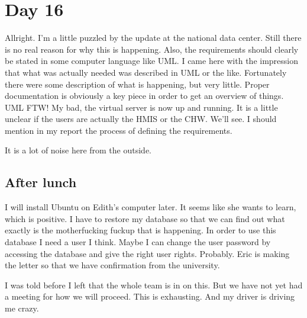 \section{Day 16}
Allright. I'm a little puzzled by the update at the national data center.
Still there is no real reason for why this is happening.
Also, the requirements should clearly be stated in some computer language like UML.
I came here with the impression that what was actually needed was described in UML or the like.
Fortunately there were some description of what is happening, but very little.
Proper documentation is obviously a key piece in order to get an overview of things.
UML FTW!
My bad, the virtual server is now up and running.
It is a little unclear if the users are actually the HMIS or the CHW. 
We'll see.
I should mention in my report the process of defining the requirements.

It is a lot of noise here from the outside.

\subsection{After lunch}
I will install Ubuntu on Edith's computer later. 
It seems like she wants to learn, which is positive.
I have to restore my database so that we can find out what exactly is the motherfucking fuckup that is happening.
In order to use this database I need a user I think. Maybe I can change the user password by accessing the database and give the right user rights. Probably.
Eric is making the letter so that we have confirmation from the university.


I was told before I left that the whole team is in on this. But we have not yet had a meeting for how we will proceed. This is exhausting. And my driver is driving me crazy.
